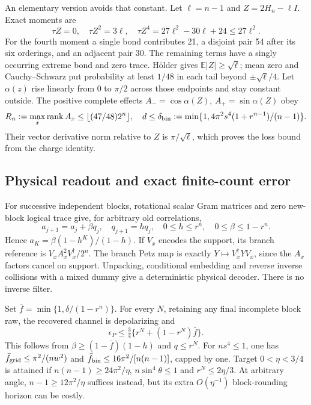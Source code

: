 An elementary version avoids that constant. Let $\ell=n-1$ and
$Z=2H_n-\ell I$. Exact moments are
\[
 \tau Z=0,\quad\tau Z^2=3\ell,\quad
 \tau Z^4=27\ell^2-30\ell+24\le27\ell^2.
\]
For the fourth moment a single bond contributes 21, a disjoint pair 54
after its six orderings, and an adjacent pair 30. The remaining terms
have a singly occurring extreme bond and zero trace. H\"older gives
$\mathbb E|Z|\ge\sqrt\ell$; mean zero and Cauchy--Schwarz put probability
at least $1/48$ in each tail beyond $\pm\sqrt\ell/4$.
Let $\alpha(z)$ rise linearly from 0 to $\pi/2$ across those endpoints
and stay constant outside. The positive complete effects
$A_- =\cos\alpha(Z)$, $A_+=\sin\alpha(Z)$ obey
\[
 R_n:=\max_x\operatorname{rank}A_x\le\lfloor(47/48)2^n\rfloor,
 \quad d\le\delta_{\rm bin}:=
 \min\{1,4\pi^2s^4(1+r^{n-1})/(n-1)\}.
\]
Their vector derivative norm relative to $Z$ is $\pi/\sqrt\ell$,
which proves the loss bound from the charge identity.

\subsection{Physical readout and exact finite-count error}
For successive independent blocks, rotational scalar Gram matrices and
zero new-block logical trace give, for arbitrary old correlations,
\[
 a_{j+1}=a_j+\beta q_j,\quad q_{j+1}=h q_j,
 \quad0\le h\le r^n,\quad0\le\beta\le1-r^n.
\]
Hence $a_K=\beta(1-h^K)/(1-h)$. If $V_x$ encodes the support, its branch
reference is $V_xA_x^2V_x^\dagger/2^n$. The branch Petz map is exactly
$Y\mapsto V_x^\dagger YV_x$, since the $A_x$ factors cancel on support.
Unpacking, conditional embedding and reverse inverse collisions with a mixed
dummy give a deterministic physical decoder. There is no inverse filter.

Set $\bar f=\min\{1,\delta/(1-r^n)\}$. For every $N$, retaining any final
incomplete block raw, the recovered channel is depolarizing and
\begin{equation}
 \epsilon_P\le\tfrac34\{r^N+(1-r^N)\bar f\}.\label{eq:trainrecover}
\end{equation}
This follows from $\beta\ge(1-\bar f)(1-h)$ and $q\le r^N$.
For $ns^4\le1$, one has $\bar f_{\rm grid}\le\pi^2/(nw^2)$ and
$\bar f_{\rm bin}\le16\pi^2/[n(n-1)]$, capped by one.
Target $0<\eta<3/4$ is attained if $n(n-1)\ge24\pi^2/\eta$,
$n\sin^4\theta\le1$ and $r^N\le2\eta/3$.
At arbitrary angle, $n-1\ge12\pi^2/\eta$ suffices instead, but its
extra $O(\eta^{-1})$ block-rounding horizon can be costly.

